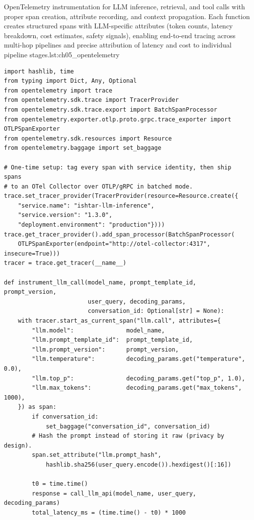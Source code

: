 \begin{codebox}{OpenTelemetry instrumentation for LLM inference, retrieval, and tool calls with proper span creation, attribute recording, and context propagation. Each function creates structured spans with LLM-specific attributes (token counts, latency breakdown, cost estimates, safety signals), enabling end-to-end tracing across multi-hop pipelines and precise attribution of latency and cost to individual pipeline stages.}{lst:ch05_opentelemetry}
\begin{verbatim}
import hashlib, time
from typing import Dict, Any, Optional
from opentelemetry import trace
from opentelemetry.sdk.trace import TracerProvider
from opentelemetry.sdk.trace.export import BatchSpanProcessor
from opentelemetry.exporter.otlp.proto.grpc.trace_exporter import OTLPSpanExporter
from opentelemetry.sdk.resources import Resource
from opentelemetry.baggage import set_baggage

# One-time setup: tag every span with service identity, then ship spans
# to an OTel Collector over OTLP/gRPC in batched mode.
trace.set_tracer_provider(TracerProvider(resource=Resource.create({
    "service.name": "ishtar-llm-inference",
    "service.version": "1.3.0",
    "deployment.environment": "production"})))
trace.get_tracer_provider().add_span_processor(BatchSpanProcessor(
    OTLPSpanExporter(endpoint="http://otel-collector:4317", insecure=True)))
tracer = trace.get_tracer(__name__)

def instrument_llm_call(model_name, prompt_template_id, prompt_version,
                        user_query, decoding_params,
                        conversation_id: Optional[str] = None):
    with tracer.start_as_current_span("llm.call", attributes={
        "llm.model":               model_name,
        "llm.prompt_template_id":  prompt_template_id,
        "llm.prompt_version":      prompt_version,
        "llm.temperature":         decoding_params.get("temperature", 0.0),
        "llm.top_p":               decoding_params.get("top_p", 1.0),
        "llm.max_tokens":          decoding_params.get("max_tokens", 1000),
    }) as span:
        if conversation_id:
            set_baggage("conversation_id", conversation_id)
        # Hash the prompt instead of storing it raw (privacy by design).
        span.set_attribute("llm.prompt_hash",
            hashlib.sha256(user_query.encode()).hexdigest()[:16])

        t0 = time.time()
        response = call_llm_api(model_name, user_query, decoding_params)
        total_latency_ms = (time.time() - t0) * 1000


\end{verbatim}
\end{codebox}

